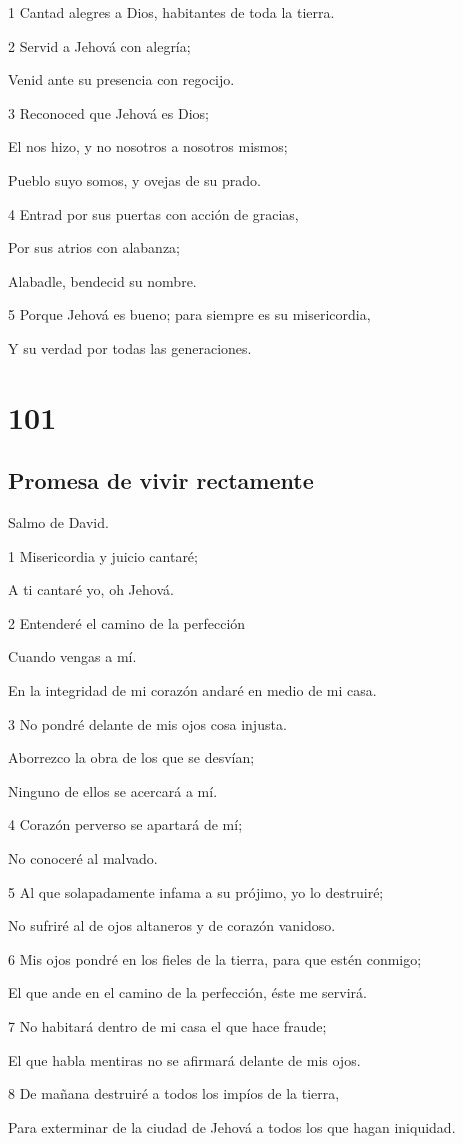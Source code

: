 \par 1 Cantad alegres a Dios, habitantes de toda la tierra.
\par 2 Servid a Jehová con alegría;
\par Venid ante su presencia con regocijo.
\par 3 Reconoced que Jehová es Dios;
\par El nos hizo, y no nosotros a nosotros mismos;
\par Pueblo suyo somos, y ovejas de su prado.
\par 4 Entrad por sus puertas con acción de gracias,
\par Por sus atrios con alabanza;
\par Alabadle, bendecid su nombre.
\par 5 Porque Jehová es bueno; para siempre es su misericordia,
\par Y su verdad por todas las generaciones.

\chapter{101}

\section*{Promesa de vivir rectamente}

\par Salmo de David.

\par 1 Misericordia y juicio cantaré;
\par A ti cantaré yo, oh Jehová.
\par 2 Entenderé el camino de la perfección
\par Cuando vengas a mí.
\par En la integridad de mi corazón andaré en medio de mi casa.
\par 3 No pondré delante de mis ojos cosa injusta.
\par Aborrezco la obra de los que se desvían;
\par Ninguno de ellos se acercará a mí.
\par 4 Corazón perverso se apartará de mí;
\par No conoceré al malvado.
\par 5 Al que solapadamente infama a su prójimo, yo lo destruiré;
\par No sufriré al de ojos altaneros y de corazón vanidoso.
\par 6 Mis ojos pondré en los fieles de la tierra, para que estén conmigo;
\par El que ande en el camino de la perfección, éste me servirá.
\par 7 No habitará dentro de mi casa el que hace fraude;
\par El que habla mentiras no se afirmará delante de mis ojos.
\par 8 De mañana destruiré a todos los impíos de la tierra,
\par Para exterminar de la ciudad de Jehová a todos los que hagan iniquidad.

